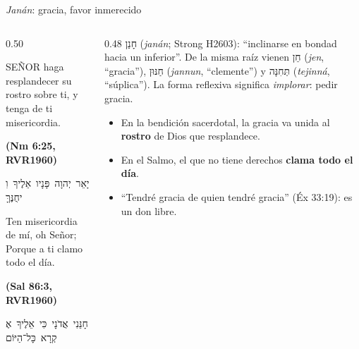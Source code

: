 \documentclass[hyperref={bookmarks=false},aspectratio=169]{beamer}
\newcommand{\heb}[1]{\mbox{\foreignlanguage{hebrew}{#1}}}
\newcommand{\SENOR}{S{\fontsize{0.78em}{1em}\selectfont EÑOR}}
\newcommand{\fuente}[1]{\par\hfill{\upshape\bfseries\footnotesize\textcolor{azul}{#1}}}
\newcommand{\destacar}[1]{\textbf{\textcolor{azul}{#1}}}
\begin{document}
\begin{frame}{\emph{Janán}: gracia, favor inmerecido}
\begin{columns}[t,onlytextwidth]
\begin{column}{0.50\textwidth}
\begin{cita}\SENOR{} haga resplandecer su rostro sobre ti, y tenga de ti misericordia.\fuente{(Nm 6:25, RVR1960)}\end{cita}
\begin{center}\heb{יָאֵר יְהוָה פָּנָיו אֵלֶיךָ וִיחֻנֶּךָּ}\end{center}
\begin{cita}Ten misericordia de mí, oh Señor; Porque a ti clamo todo el día.\fuente{(Sal 86:3, RVR1960)}\end{cita}
\begin{center}\heb{חָנֵּנִי אֲדֹנָי כִּי אֵלֶיךָ אֶקְרָא כָּל־הַיּוֹם}\end{center}
\end{column}
\begin{column}{0.48\textwidth}\scriptsize
\heb{חָנַן} (\emph{janán}; Strong H2603): ``inclinarse en bondad hacia un inferior''. De la misma raíz vienen \heb{חֵן} (\emph{jen}, ``gracia''), \heb{חַנּוּן} (\emph{jannun}, ``clemente'') y \heb{תְּחִנָּה} (\emph{tejinná}, ``súplica''). La forma reflexiva significa \emph{implorar}: pedir gracia.\par\medskip
\small
\begin{itemize}
\item En la bendición sacerdotal, la gracia va unida al \destacar{rostro} de Dios que resplandece.
\item En el Salmo, el que no tiene derechos \destacar{clama todo el día}.
\item ``Tendré gracia de quien tendré gracia'' (Éx 33:19): es un don libre.
\end{itemize}
\end{column}
\end{columns}
\end{frame}
\end{document}
